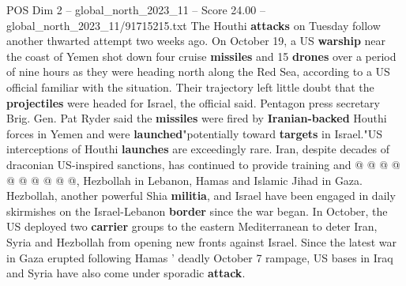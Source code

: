 \begin{textsample}{POS Dim 2 – global\_north\_2023\_11 – Score 24.00 – global\_north\_2023\_11/91715215.txt}
The Houthi \textbf{attacks} on Tuesday follow another thwarted attempt two weeks ago.
On October 19, a US \textbf{warship} near the coast of Yemen shot down four cruise \textbf{missiles} and 15 \textbf{drones} over a period of nine hours as they were heading north along the Red Sea, according to a US official familiar with the situation.
Their trajectory left little doubt that the \textbf{projectiles} were headed for Israel, the official said.
Pentagon press secretary Brig.
Gen.
Pat Ryder said the \textbf{missiles} were fired by \textbf{Iranian-backed} Houthi forces in Yemen and were \textbf{launched}"potentially toward \textbf{targets} in Israel."US interceptions of Houthi \textbf{launches} are exceedingly rare.
Iran, despite decades of draconian US-inspired sanctions, has continued to provide training and @ @ @ @ @ @ @ @ @ @, Hezbollah in Lebanon, Hamas and Islamic Jihad in Gaza.
Hezbollah, another powerful Shia \textbf{militia}, and Israel have been engaged in daily skirmishes on the Israel-Lebanon \textbf{border} since the war began.
In October, the US deployed two \textbf{carrier} groups to the eastern Mediterranean to deter Iran, Syria and Hezbollah from opening new fronts against Israel.
Since the latest war in Gaza erupted following Hamas ' deadly October 7 rampage, US bases in Iraq and Syria have also come under sporadic \textbf{attack}.

\end{textsample}

